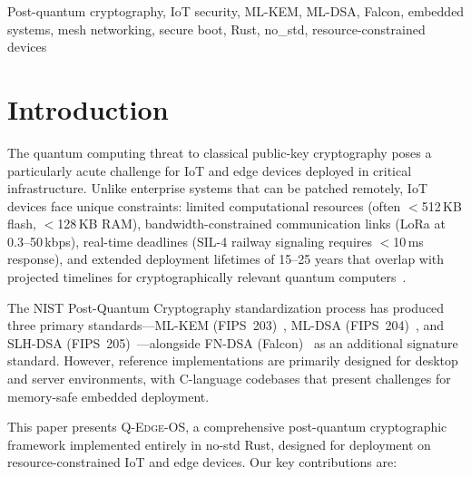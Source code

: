 \documentclass[conference,10pt]{IEEEtran}
\newcommand{\system}{\textsc{Q-Edge-OS}}
\begin{document}
\begin{IEEEkeywords}
Post-quantum cryptography, IoT security, ML-KEM, ML-DSA, Falcon, embedded systems, mesh networking, secure boot, Rust, no\_std, resource-constrained devices
\end{IEEEkeywords}

\section{Introduction}

The quantum computing threat to classical public-key cryptography poses a particularly acute challenge for IoT and edge devices deployed in critical infrastructure. Unlike enterprise systems that can be patched remotely, IoT devices face unique constraints: limited computational resources (often $<$512\,KB flash, $<$128\,KB RAM), bandwidth-constrained communication links (LoRa at 0.3--50\,kbps), real-time deadlines (SIL-4 railway signaling requires $<$10\,ms response), and extended deployment lifetimes of 15--25 years that overlap with projected timelines for cryptographically relevant quantum computers~\cite{mosca2018}.

The NIST Post-Quantum Cryptography standardization process has produced three primary standards---ML-KEM (FIPS~203)~\cite{fips203}, ML-DSA (FIPS~204)~\cite{fips204}, and SLH-DSA (FIPS~205)~\cite{fips205}---alongside FN-DSA (Falcon)~\cite{falcon} as an additional signature standard. However, reference implementations are primarily designed for desktop and server environments, with C-language codebases that present challenges for memory-safe embedded deployment.

This paper presents \system{}, a comprehensive post-quantum cryptographic framework implemented entirely in no-std Rust, designed for deployment on resource-constrained IoT and edge devices. Our key contributions are:
\end{document}
